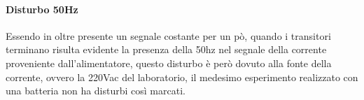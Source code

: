 \begin{enumerate}
	      \paragraph{Disturbo 50Hz} Essendo in oltre presente un segnale costante per un pò, quando i transitori terminano risulta evidente la presenza della 50hz nel segnale della corrente proveniente dall'alimentatore, questo disturbo è però dovuto alla fonte della corrente, ovvero la 220Vac del laboratorio, il medesimo esperimento realizzato con una batteria non ha disturbi così marcati.
\end{enumerate}
